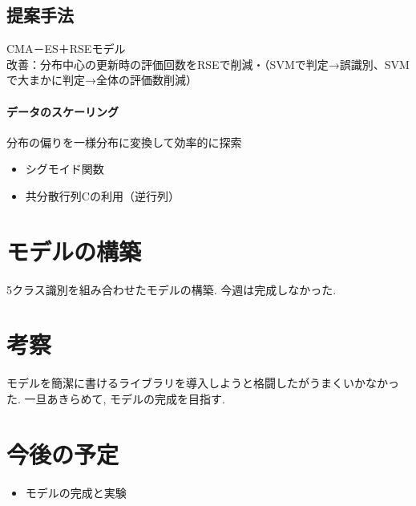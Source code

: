 \documentclass[twocolumn]{jarticle}     %
\begin{document}


\subsection{提案手法}
CMA－ES＋RSEモデル\\
改善：分布中心の更新時の評価回数をRSEで削減・（SVMで判定→誤識別、SVMで大まかに判定→全体の評価数削減）

\paragraph{データのスケーリング}
分布の偏りを一様分布に変換して効率的に探索
\begin{itemize}
  \item シグモイド関数
  \item 共分散行列Cの利用（逆行列）
\end{itemize}

\section{モデルの構築}
5クラス識別を組み合わせたモデルの構築. 今週は完成しなかった.

\section{考察}
モデルを簡潔に書けるライブラリを導入しようと格闘したがうまくいかなかった. 一旦あきらめて, モデルの完成を目指す.

\section{今後の予定}
\begin{itemize}
	\item {モデルの完成と実験}
\end{itemize}



\end{document}
